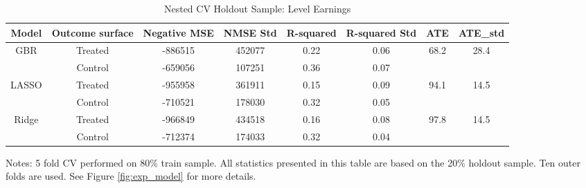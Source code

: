 \documentclass[12pt, a4paper]{article}
\begin{document}
\begin{landscape}
\clearpage
\begin{table}[H]
\centering
\small
\caption{Nested CV Holdout Sample: Level Earnings}
\begin{tabular}{cccccccc}
\toprule
Model   &  Outcome surface  &  Negative MSE  &  NMSE Std  &  R-squared  &  R-squared Std  & ATE   & ATE\_std   \\
\midrule                         
\multirow{2}{*}{\hfil GBR}  &  Treated  &  -886515  &  452077 &  0.22  &  0.06  &  \multirow{2}{*}{\hfil 68.2}  &  \multirow{2}{*}{\hfil  28.4 }	 \\
&  Control  &  -659056  &  107251	 &  0.36 & 0.07  & & \\
\midrule																						
\multirow{2}{*}{\hfil LASSO} & Treated & -955958	 & 361911	 & 0.15	 & 0.09	 & \multirow{2}{*}{\hfil 94.1}	 & \multirow{2}{*}{\hfil 14.5}	 \\
& Control	 & -710521 & 	178030	 & 0.32	 & 0.05	 & & \\
\midrule  																								
\multirow{2}{*}{\hfil Ridge}	 & Treated	 & -966849	& 434518	 & 0.16	 & 0.08	 &  \multirow{2}{*}{\hfil  97.8}  &  \multirow{2}{*}{\hfil 14.5}	 \\
&  Control  &  -712374  &  174033  &  0.32  &  0.04  & & \\
\bottomrule
\end{tabular}
\par\medskip
\parbox{1.1\textwidth}{\footnotesize Notes: 5 fold CV performed on 80\% train sample. All statistics presented in this table are based on the 20\% holdout sample. Ten outer folds are used. See Figure \ref{fig:exp_model} for more details.} 
\label{tab:ncvhos}
\end{table}


\end{landscape}
\end{document}

